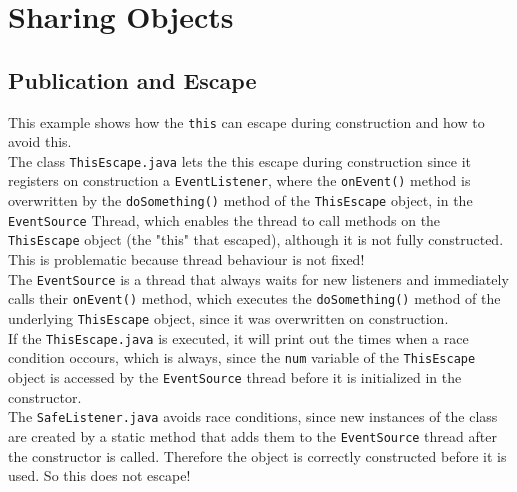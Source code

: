 \documentclass{article}
\begin{document}
  \section{Sharing Objects}

    \subsection{Publication and Escape}

    This example shows how the \texttt{this} can escape during construction and how to avoid this.
    \\
    The class \texttt{ThisEscape.java} lets the this escape during construction since it registers on construction a \texttt{EventListener}, where the \texttt{onEvent()} method is overwritten by the \texttt{doSomething()} method of the \texttt{ThisEscape} object, in the \texttt{EventSource} Thread, which enables the thread to call methods on the \texttt{ThisEscape} object (the "this" that escaped), although it is not fully constructed. This is problematic because thread behaviour is not fixed!
    \\
    The \texttt{EventSource} is a thread that always waits for new listeners and immediately calls their \texttt{onEvent()} method, which executes the \texttt{doSomething()} method of the underlying \texttt{ThisEscape} object, since it was overwritten on construction.
    \\
    If the \texttt{ThisEscape.java} is executed, it will print out the times when a race condition occours, which is always, since the \texttt{num} variable of the \texttt{ThisEscape} object is accessed by the \texttt{EventSource} thread before it is initialized in the constructor.
    \\
    The \texttt{SafeListener.java} avoids race conditions, since new instances of the class are created by a static method that adds them to the \texttt{EventSource} thread after the constructor is called. Therefore the object is correctly constructed before it is used. So this does not escape!
\end{document}
